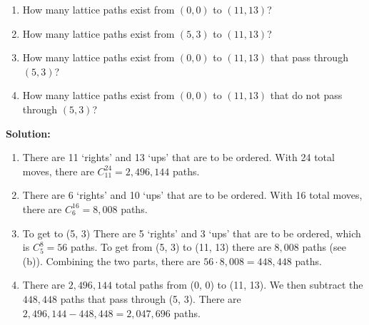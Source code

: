 \documentclass{article}
\newenvironment{solution}
{
\par
\color{blue}
\textbf{Solution:}
}
{
\par
}
\begin{document}
\begin{enumerate}
\begin{enumerate}
    \item How many lattice paths exist from $(0,0)$ to $(11,13)$?
    \item How many lattice paths exist from $(5,3)$ to $(11,13)$?
    \item How many lattice paths exist from $(0,0)$ to $(11,13)$ that pass through $(5,3)$?
    \item How many lattice paths exist from $(0,0)$ to $(11,13)$ that do not pass through $(5,3)$?
\end{enumerate}
\begin{solution}
\begin{enumerate}
    \item There are 11 `rights' and 13 `ups' that are to be ordered. With 24 total moves, there are $C^{24}_{11} = 2,496,144$ paths.
    \item There are 6 `rights' and 10 `ups' that are to be ordered. With 16 total moves, there are $C^{16}_{6} = 8,008$ paths.
    \item To get to (5, 3) There are 5 `rights' and 3 `ups' that are to be ordered, which is $C^{8}_{5} = 56$ paths. To get from (5, 3) to (11, 13) there are $8,008$ paths (see (b)). Combining the two parts, there are $56 \cdot 8,008 = 448,448$ paths.
    \item There are $2,496,144$ total paths from (0, 0) to (11, 13). We then subtract the $448,448$ paths that pass through (5, 3). There are $2,496,144 - 448,448 = 2,047,696$ paths.
\end{enumerate}
\end{solution}

\end{enumerate}
\end{document}
